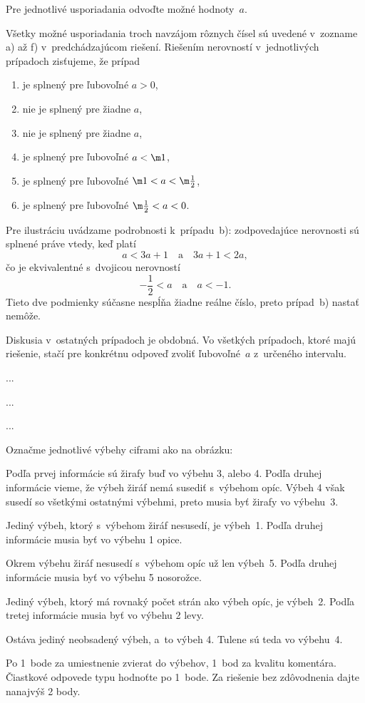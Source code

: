 {\napadd
Pre jednotlivé usporiadania odvoďte možné hodnoty~$a$.

\ineriesenie
Všetky možné usporiadania troch navzájom rôznych čísel sú uvedené v~zozname a) až f) v~predchádzajúcom riešení.
Riešením nerovností v~jednotlivých prípadoch zisťujeme, že prípad
\begin{enumerate}\alphatrue
\item je splnený pre ľubovoľné $a>0$,
\item nie je splnený pre žiadne $a$,
\item nie je splnený pre žiadne $a$,
\item je splnený pre ľubovoľné $a<\m1$,
\item je splnený pre ľubovoľné $\m1<a<\m\frac12$,
\item je splnený pre ľubovoľné $\m\frac12<a<0$.
\end{enumerate}

Pre ilustráciu uvádzame podrobnosti k~prípadu~b):
zodpovedajúce nerovnosti sú splnené práve vtedy, keď platí
$$
a<3a+1\quad\text{a}\quad 3a+1<2a,
$$
čo je ekvivalentné s~dvojicou nerovností
$$
-\frac12<a\quad\text{a}\quad a<-1.
$$
Tieto dve podmienky súčasne nespĺňa žiadne reálne číslo, preto prípad~b) nastať nemôže.

Diskusia v~ostatných prípadoch je obdobná.
Vo všetkých prípadoch, ktoré majú riešenie, stačí pre konkrétnu odpoveď zvoliť ľubovoľné~$a$ z~určeného intervalu.}

{%
...}

{%
...}

{%
...}

{%
Označme jednotlivé výbehy ciframi ako na obrázku:
%

Podľa prvej informácie sú žirafy buď vo výbehu 3, alebo 4.
Podľa druhej informácie vieme, že výbeh žiráf nemá susediť s~výbehom opíc.
Výbeh 4 však susedí so všetkými ostatnými výbehmi, preto musia byť žirafy
vo výbehu~3.

Jediný výbeh, ktorý s~výbehom žiráf nesusedí, je výbeh~1.
Podľa druhej informácie musia byť vo výbehu 1 opice.

Okrem výbehu žiráf nesusedí s~výbehom opíc už len výbeh~5.
Podľa druhej informácie musia byť vo výbehu 5 nosorožce.

Jediný výbeh, ktorý má rovnaký počet strán ako výbeh opíc, je výbeh~2.
Podľa tretej informácie musia byť vo výbehu 2 levy.

Ostáva jediný neobsadený výbeh, a~to výbeh 4.
Tulene sú teda vo výbehu~4.

\hodnotenie
Po 1~bode za umiestnenie zvierat do výbehov, 1~bod za kvalitu komentára.
Čiastkové odpovede typu  hodnoťte po 1~bode.
Za riešenie bez zdôvodnenia dajte nanajvýš 2 body.
\endhodnotenie}


